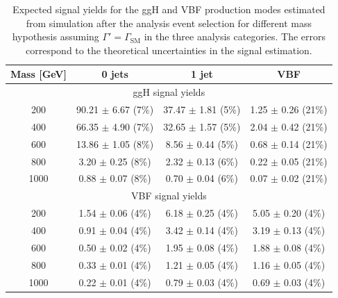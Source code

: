\begin{table}[htb]
\begin{center}
\caption{Expected signal yields for the ggH and VBF production modes estimated from simulation after the analysis event selection for different mass hypothesis assuming $\Gamma' = \Gamma_\mathrm{SM}$ in the three analysis categories. The errors correspond to the theoretical uncertainties in the signal estimation.}\label{tab:sig_yields}
\small{\begin{tabular}{c c c c } 
\toprule
                 Mass [GeV]                 &          0 jets    &          1 jet              & VBF           \\ 
\midrule
\multicolumn{4}{c}{ggH signal yields} \\
\midrule
 200                        &      90.21 $\pm$       6.67 (7\%)             &      37.47 $\pm$       1.81 (5\%)     &       1.25 $\pm$       0.26 (21\%)      \\
 400                        &      66.35 $\pm$       4.90 (7\%)             &      32.65 $\pm$       1.57 (5\%)     &       2.04 $\pm$       0.42 (21\%)      \\
 600                        &      13.86 $\pm$       1.05 (8\%)             &       8.56 $\pm$       0.44 (5\%)     &       0.68 $\pm$       0.14 (21\%)      \\
 800                        &       3.20 $\pm$       0.25 (8\%)             &       2.32 $\pm$       0.13 (6\%)     &       0.22 $\pm$       0.05 (21\%)      \\
 1000                       &       0.88 $\pm$       0.07 (8\%)             &       0.70 $\pm$       0.04 (6\%)     &       0.07 $\pm$       0.02 (21\%)      \\
\midrule
\multicolumn{4}{c}{VBF signal yields} \\
\midrule
 200                        &       1.54 $\pm$       0.06 (4\%)             &       6.18 $\pm$       0.25 (4\%)     &       5.05 $\pm$       0.20 (4\%)      \\
 400                        &       0.91 $\pm$       0.04 (4\%)             &       3.42 $\pm$       0.14 (4\%)     &       3.19 $\pm$       0.13 (4\%)      \\
 600                        &       0.50 $\pm$       0.02 (4\%)             &       1.95 $\pm$       0.08 (4\%)     &       1.88 $\pm$       0.08 (4\%)      \\
 800                        &       0.33 $\pm$       0.01 (4\%)             &       1.21 $\pm$       0.05 (4\%)     &       1.16 $\pm$       0.05 (4\%)      \\
 1000                       &       0.22 $\pm$       0.01 (4\%)             &       0.79 $\pm$       0.03 (4\%)     &       0.69 $\pm$       0.03 (4\%)      \\
\bottomrule
\end{tabular}
}
\end{center}
\end{table}

